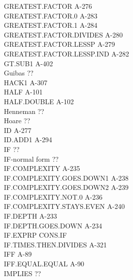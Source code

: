 \documentclass[10pt]{book}
\newenvironment{pubasis}{\begin{flushleft}}{\end{flushleft}}
\begin{document}
\begin{pubasis}
GREATEST.FACTOR                              A-276\\
GREATEST.FACTOR.0                            A-283\\
GREATEST.FACTOR.1                            A-284\\
GREATEST.FACTOR.DIVIDES                      A-280\\
GREATEST.FACTOR.LESSP                        A-279\\
GREATEST.FACTOR.LESSP.IND                    A-282\\
GT.SUB1                                      A-402\\
Guibas                                       ??\\
HACK1                                        A-307\\
HALF                                         A-101\\
HALF.DOUBLE                                  A-102\\
Henneman                                     ??\\
Hoare                                        ??\\
ID                                           A-277\\
ID.ADD1                                      A-294\\
IF                                           ??\\
IF-normal form                               ??\\
IF.COMPLEXITY                                A-235\\
IF.COMPLEXITY.GOES.DOWN1                     A-238\\
IF.COMPLEXITY.GOES.DOWN2                     A-239\\
IF.COMPLEXITY.NOT.0                          A-236\\
IF.COMPLEXITY.STAYS.EVEN                     A-240\\
IF.DEPTH                                     A-233\\
IF.DEPTH.GOES.DOWN                           A-234\\
IF.EXPRP                                     CONS.IF\\
IF.TIMES.THEN.DIVIDES                        A-321\\
IFF                                          A-89\\
IFF.EQUAL.EQUAL                              A-90\\
IMPLIES                                      ??\\

\end{pubasis}
\end{document}
